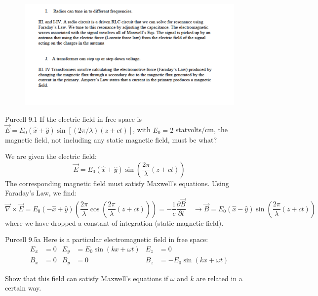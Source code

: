 \documentclass[makesolutionspdf]{esg8022pset}
\begin{document}
\begin{solution}
\begin{figure}[H]
    \centering
    \includegraphics[width = 15cm]{max_gen_solc}
  \end{figure}

\end{solution}

\begin{problem}{Purcell 9.1}
  If the electric field in free space is $\vec E = E_0(\hat x + \hat y)\sin\left[(2\pi / \lambda)(z + ct)\right]$,
  with $E_0 = 2$ statvolts/cm, the magnetic field, not
  including any static magnetic field, must be what?
\end{problem}

\begin{solution}
  We are given the electric field:
  $$\vec E = E_0(\hat x + \hat y)\sin\left(\frac{2\pi}{\lambda} (z + ct)\right)$$
  The corresponding magnetic field must satisfy Maxwell's equations. Using Faraday's Law, we find:
  $$\vec \nabla \times \vec E = E_0(-\hat x + \hat y)\left(\frac{2\pi}{\lambda}\cos\left(\frac{2\pi}{\lambda}(z + ct)\right)\right) = -\frac{1}{c}\frac{\partial\vec{B}}{\partial t} 
  \quad \longrightarrow 
  \vec B = E_0(\hat x - \hat y)\sin\left(\frac{2\pi}{\lambda}(z + ct)\right)$$
  where we have dropped a constant of integration (static magnetic field).
\end{solution}


\begin{problem}{Purcell 9.5a}
  Here is a particular electromagnetic field in free space:
  \begin{align*}
    E_x & = 0  &
      E_y & = E_0 \sin(kx + \omega t) &
      E_z & = 0 \\
    B_x & = 0 &
      B_y & = 0 &
      B_z & = -E_0\sin(kx + \omega t)
  \end{align*}
  
  \noindent Show that this field can satisfy Maxwell's equations if $\omega$ and
  $k$ are related in a certain way.
\end{problem}
\end{document}
